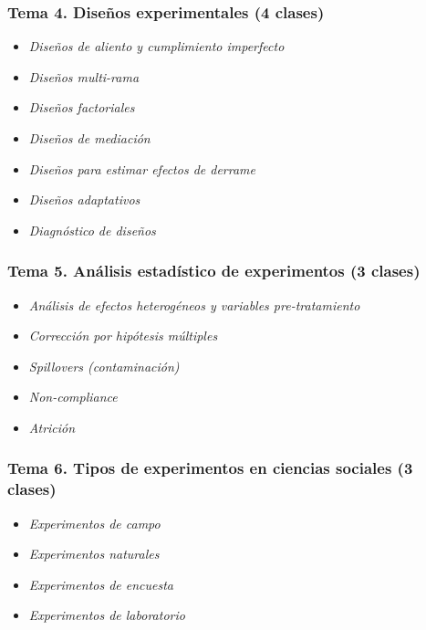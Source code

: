 \documentclass[
  12pt,
]{article}
\providecommand{\tightlist}{%
  \setlength{\itemsep}{0pt}\setlength{\parskip}{0pt}}
\begin{document}
\hypertarget{tema-4.-diseuxf1os-experimentales-4-clases}{%
\subsubsection{Tema 4. Diseños experimentales (4
clases)}\label{tema-4.-diseuxf1os-experimentales-4-clases}}

\begin{itemize}
\tightlist
\item
  \emph{Diseños de aliento y cumplimiento imperfecto}
\item
  \emph{Diseños multi-rama}
\item
  \emph{Diseños factoriales}
\item
  \emph{Diseños de mediación}
\item
  \emph{Diseños para estimar efectos de derrame}
\item
  \emph{Diseños adaptativos}
\item
  \emph{Diagnóstico de diseños}
\end{itemize}

\hypertarget{tema-5.-anuxe1lisis-estaduxedstico-de-experimentos-3-clases}{%
\subsubsection{Tema 5. Análisis estadístico de experimentos (3
clases)}\label{tema-5.-anuxe1lisis-estaduxedstico-de-experimentos-3-clases}}

\begin{itemize}
\tightlist
\item
  \emph{Análisis de efectos heterogéneos y variables pre-tratamiento}
\item
  \emph{Corrección por hipótesis múltiples}
\item
  \emph{Spillovers (contaminación)}
\item
  \emph{Non-compliance}
\item
  \emph{Atrición}
\end{itemize}

\hypertarget{tema-6.-tipos-de-experimentos-en-ciencias-sociales-3-clases}{%
\subsubsection{Tema 6. Tipos de experimentos en ciencias sociales (3
clases)}\label{tema-6.-tipos-de-experimentos-en-ciencias-sociales-3-clases}}

\begin{itemize}
\tightlist
\item
  \emph{Experimentos de campo}
\item
  \emph{Experimentos naturales}
\item
  \emph{Experimentos de encuesta}
\item
  \emph{Experimentos de laboratorio}
\end{itemize}
\end{document}

